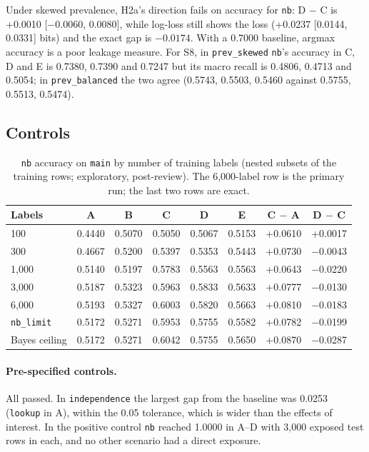 \documentclass[11pt]{article}
\newcommand{\code}[1]{\texttt{#1}}
\begin{document}
Under skewed prevalence, H2a's direction fails on accuracy for \code{nb}: D $-$ C is +0.0010 [$-0.0060$, 0.0080], while log-loss still shows the loss (+0.0237 [0.0144, 0.0331] bits) and the exact gap is $-0.0174$. With a 0.7000 baseline, argmax accuracy is a poor leakage measure. For S8, in \code{prev\_skewed} \code{nb}'s accuracy in C, D and E is 0.7380, 0.7390 and 0.7247 but its macro recall is 0.4806, 0.4713 and 0.5054; in \code{prev\_balanced} the two agree (0.5743, 0.5503, 0.5460 against 0.5755, 0.5513, 0.5474).

\subsection{Controls}
\label{sec:controls}

\begin{table}[htbp]
\centering\footnotesize
\caption{\code{nb} accuracy on \code{main} by number of training labels (nested subsets of the training rows; exploratory, post-review). The 6,000-label row is the primary run; the last two rows are exact.}
\label{tab:learning}
\setlength{\tabcolsep}{5pt}
\begin{tabular}{@{}lccccccc@{}}
\toprule
Labels & A & B & C & D & E & C $-$ A & D $-$ C \\
\midrule
100 & 0.4440 & 0.5070 & 0.5050 & 0.5067 & 0.5153 & +0.0610 & +0.0017 \\
300 & 0.4667 & 0.5200 & 0.5397 & 0.5353 & 0.5443 & +0.0730 & $-$0.0043 \\
1,000 & 0.5140 & 0.5197 & 0.5783 & 0.5563 & 0.5563 & +0.0643 & $-$0.0220 \\
3,000 & 0.5187 & 0.5323 & 0.5963 & 0.5833 & 0.5633 & +0.0777 & $-$0.0130 \\
6,000 & 0.5193 & 0.5327 & 0.6003 & 0.5820 & 0.5663 & +0.0810 & $-$0.0183 \\
\midrule
\code{nb\_limit} & 0.5172 & 0.5271 & 0.5953 & 0.5755 & 0.5582 & +0.0782 & $-$0.0199 \\
Bayes ceiling & 0.5172 & 0.5271 & 0.6042 & 0.5755 & 0.5650 & +0.0870 & $-$0.0287 \\
\bottomrule
\end{tabular}
\end{table}

\paragraph{Pre-specified controls.} All passed. In \code{independence} the largest gap from the baseline was 0.0253 (\code{lookup} in A), within the 0.05 tolerance, which is wider than the effects of interest. In the positive control \code{nb} reached 1.0000 in A--D with 3,000 exposed test rows in each, and no other scenario had a direct exposure.
\end{document}
